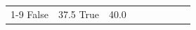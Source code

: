\begin{table}[H]
\begin{tabular}{lllrlllll}
\cline{1-9}
False & 37.5%
\cline{1-9}
True & 40.0%

\end{tabular}
\end{table}
